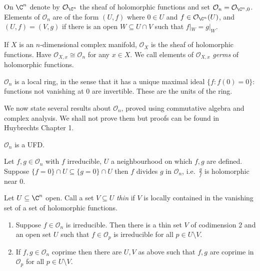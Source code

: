 \documentclass[a4paper]{article}
\begin{document}
On \(\C^n\) denote by \(\mathcal O_{\C^n}\) the sheaf of holomorphic functions and set \(\mathcal O_n = \mathcal O_{\C^n, 0}\). Elements of \(\mathcal O_n\) are of the form \((U, f)\) where \(0 \in U\) and \(f \in \mathcal O_{\C^n}(U)\), and \((U, f) = (V, g)\) if there is an open \(W \subseteq U \cap V\) such that \(f|_W = g|_W\).

If \(X\) is an \(n\)-dimensional complex manifold, \(\mathcal O_X\) is the sheaf of holomorphic functions. Have \(\mathcal O_{X, x} \cong \mathcal O_n\) for any \(x \in X\). We call elements of \(\mathcal O_{X, x}\) \emph{germs} of holomorphic functions.

\(\mathcal O_n\) is a local ring, in the sense that it has a unique maximal ideal \(\{f: f(0) = 0\}\): functions not vanishing at \(0\) are invertible. These are the units of the ring.

We now state several results about \(\mathcal O_n\), proved using commutative algebra and complex analysis. We shall not prove them but proofs can be found in Huybrechts Chapter 1.

\begin{theorem}
  \(\mathcal O_n\) is a UFD.
\end{theorem}

\begin{theorem}
  Let \(f, g \in \mathcal O_n\) with \(f\) irreducible, \(U\) a neighbourhood on which \(f, g\) are defined. Suppose \(\{f = 0\} \cap U \subseteq \{g = 0\} \cap U\) then \(f\) divides \(g\) in \(\mathcal O_n\), i.e.\ \(\frac{g}{f}\) is holomorphic near \(0\).
\end{theorem}

\begin{definition}[thin]
  Let \(U \subseteq \C^n\) open. Call a set \(V \subseteq U\) \emph{thin} if \(V\) is locally contained in the vanishing set of a set of holomorphic functions.
\end{definition}

\begin{theorem}\leavevmode
  \label{thm:thin set}
  \begin{enumerate}
  \item Suppose \(f \in \mathcal O_n\) is irreducible. Then there is a thin set \(V\) of codimension \(2\) and an open set \(U\) such that \(f \in \mathcal O_p\) is irreducible for all \(p \in U \setminus V\).
  \item If \(f, g \in \mathcal O_n\) coprime then there are \(U, V\) as above such that \(f, g\) are coprime in \(\mathcal O_p\) for all \(p \in U \setminus V\).
  \end{enumerate}
\end{theorem}
\end{document}
